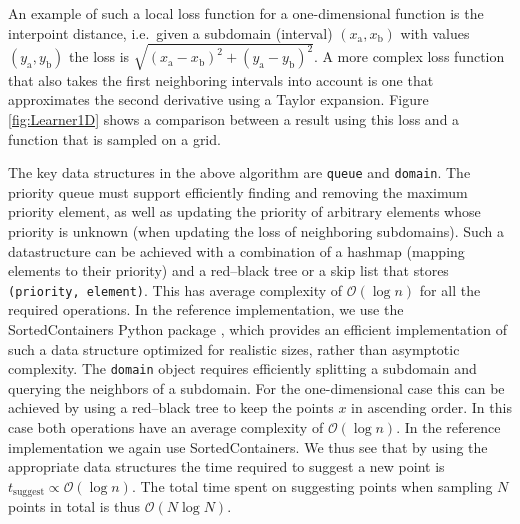 
An example of such a local loss function for a one-dimensional function is the interpoint distance, i.e.~given a subdomain (interval) $(x_\textrm{a}, x_\textrm{b})$ with values $(y_\textrm{a}, y_\textrm{b})$ the loss is $\sqrt{(x_\textrm{a} - x_\textrm{b})^2 + (y_\textrm{a} - y_\textrm{b})^2}$.
A more complex loss function that also takes the first neighboring intervals into account is one that approximates the second derivative using a Taylor expansion.
Figure \ref{fig:Learner1D} shows a comparison between a result using this loss and a function that is sampled on a grid.


The key data structures in the above algorithm are \passthrough{\lstinline!queue!} and \passthrough{\lstinline!domain!}.
The priority queue must support efficiently finding and removing the maximum priority element, as well as updating the priority of arbitrary elements whose priority is unknown (when updating the loss of neighboring subdomains).
Such a datastructure can be achieved with a combination of a hashmap (mapping elements to their priority) and a red--black tree or a skip list \cite{Cormen2009} that stores \passthrough{\lstinline!(priority, element)!}.
This has average complexity of $\mathcal{O}(\log{n})$ for all the required operations.
In the reference implementation, we use the SortedContainers Python package \cite{Jenks2014}, which provides an efficient implementation of such a data structure optimized for realistic sizes, rather than asymptotic complexity.
The \passthrough{\lstinline!domain!} object requires efficiently splitting a subdomain and querying the neighbors of a subdomain.
For the one-dimensional case this can be achieved by using a red--black tree to keep the points $x$ in ascending order.
In this case both operations have an average complexity of $\mathcal{O}(\log{n})$.
In the reference implementation we again use SortedContainers.
We thus see that by using the appropriate data structures the time required to suggest a new point is $t_\textrm{suggest} \propto \mathcal{O}(\log{n})$.
The total time spent on suggesting points when sampling $N$ points in total is thus $\mathcal{O}(N \log{N})$.


